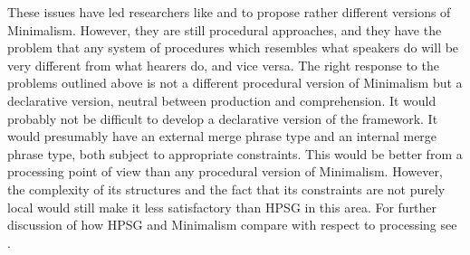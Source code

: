 \documentclass[output=paper
	        ,collection
	        ,collectionchapter
 	        ,biblatex
                ,babelshorthands
                ,newtxmath
                ,draftmode
                ,colorlinks, citecolor=brown
]{langscibook}
\begin{document}
These issues have led researchers like \citet{Phillips2003a} and \citet{Chesi2015a-u} to propose rather different
versions of Minimalism. However, they are still procedural approaches, and they have the problem
that any system of procedures which resembles what speakers do will be very different from what
hearers do, and vice versa. The right response to the problems outlined above is not a different
procedural version of Minimalism but a declarative version, neutral between production and
comprehension. It would probably not be difficult to develop a declarative version of the
framework. It would presumably have an external merge phrase type and an internal merge phrase type,
both subject to appropriate constraints. This would be better from a processing point of view than
any procedural version of Minimalism. However, the complexity of its structures and the fact that
its constraints are not purely local would still make it less satisfactory than HPSG in this area.
For further discussion of how HPSG and Minimalism compare with respect to processing see .




\end{document}
